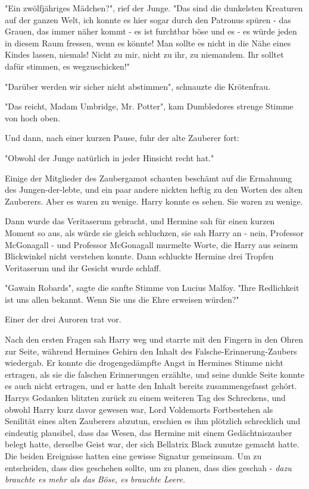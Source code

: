 {"Ein zwölfjähriges Mädchen?", rief der Junge. "Das sind die dunkelsten Kreaturen auf der ganzen Welt, ich konnte es hier sogar durch den Patronus spüren - das Grauen, das immer näher kommt - es ist furchtbar böse und es - es würde jeden in diesem Raum fressen, wenn es könnte! Man sollte es nicht in die Nähe eines Kindes lassen, niemals! Nicht zu mir, nicht zu ihr, zu niemandem. Ihr solltet dafür stimmen, es wegzuschicken!"

"Darüber werden wir sicher nicht abstimmen", schnauzte die Krötenfrau.

"Das reicht, Madam Umbridge, Mr. Potter", kam Dumbledores strenge Stimme von hoch oben.

Und dann, nach einer kurzen Pause, fuhr der alte Zauberer fort:

"Obwohl der Junge natürlich in jeder Hinsicht recht hat."

Einige der Mitglieder des Zaubergamot schauten beschämt auf die Ermahnung des Jungen-der-lebte, und ein paar andere nickten heftig zu den Worten des alten Zauberers. Aber es waren zu wenige. Harry konnte es sehen. Sie waren zu wenige.

Dann wurde das Veritaserum gebracht, und Hermine sah für einen kurzen Moment so aus, als würde sie gleich schluchzen, sie sah Harry an - nein, Professor McGonagall - und Professor McGonagall murmelte Worte, die Harry aus seinem Blickwinkel nicht verstehen konnte. Dann schluckte Hermine drei Tropfen Veritaserum und ihr Gesicht wurde schlaff.

"Gawain Robards", sagte die sanfte Stimme von Lucius Malfoy. "Ihre Redlichkeit ist uns allen bekannt. Wenn Sie uns die Ehre erweisen würden?"

Einer der drei Auroren trat vor.

Nach den ersten Fragen sah Harry weg und starrte mit den Fingern in den Ohren zur Seite, während Hermines Gehirn den Inhalt des Falsche-Erinnerung-Zaubers wiedergab. Er konnte die drogengedämpfte Angst in Hermines Stimme nicht ertragen, als sie die falschen Erinnerungen erzählte, und seine dunkle Seite konnte es auch nicht ertragen, und er hatte den Inhalt bereits zusammengefasst gehört. Harrys Gedanken blitzten zurück zu einem weiteren Tag des Schreckens, und obwohl Harry kurz davor gewesen war, Lord Voldemorts Fortbestehen als Senilität eines alten Zauberers abzutun, erschien es ihm plötzlich schrecklich und eindeutig plausibel, dass das Wesen, das Hermine mit einem Gedächtniszauber belegt hatte, derselbe Geist war, der sich Bellatrix Black zunutze gemacht hatte. Die beiden Ereignisse hatten eine gewisse Signatur gemeinsam. Um zu entscheiden, dass dies geschehen sollte, um zu planen, dass dies geschah - \emph{dazu brauchte es mehr als das Böse, es} \emph{brauchte Leere.}

}
